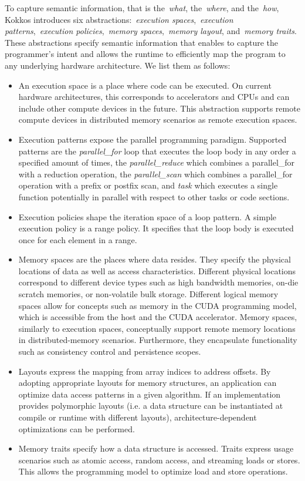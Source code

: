 To capture semantic information, that is the~\emph{what}, the~\emph{where}, and the~\emph{how}, Kokkos introduces six abstractions:~\emph{execution spaces},~\emph{execution patterns},~\emph{execution policies},~\emph{memory spaces},~\emph{memory layout}, and~\emph{memory traits}. These abstractions specify semantic information that enables to capture the programmer's intent and allows the runtime to efficiently map the program to any underlying hardware architecture. We list them as follows:
\begin{itemize}
	\item  An execution space is a place where code can be executed. On current hardware architectures, this corresponds to accelerators and CPUs and can include other compute devices in the future. This abstraction supports remote compute devices in distributed memory scenarios as remote execution spaces.
	\item Execution patterns expose the parallel programming paradigm. Supported patterns are the \emph{parallel\_for} loop that executes the loop body in any order a specified amount of times, the \emph{parallel\_reduce} which combines a parallel\_for with a reduction operation, the \emph{parallel\_scan} which combines a parallel\_for operation with a prefix or postfix scan, and \emph{task} which executes a single function potentially in parallel with respect to other tasks or code sections. 
	\item Execution policies shape the iteration space of a loop pattern. A simple execution policy is a range policy. It specifies that the loop body is executed once for each element in a range.
	\item Memory spaces are the places where data resides. They specify the physical locations of data as well as access characteristics. Different physical locations correspond to different device types such as high bandwidth memories, on-die scratch memories, or non-volatile bulk storage. Different logical memory spaces allow for concepts such as memory in the CUDA programming model, which is accessible from the host and the CUDA accelerator. Memory spaces, similarly to execution spaces, conceptually support remote memory locations in distributed-memory scenarios. Furthermore, they encapsulate functionality such as consistency control and persistence scopes.
	\item Layouts express the mapping from array indices to address offsets. By adopting appropriate layouts for memory structures, an application can optimize data access patterns in a given algorithm. If an implementation provides polymorphic layouts (i.e. a data structure can be instantiated at compile or runtime with different layouts), architecture-dependent optimizations can be performed.
	\item Memory traits specify how a data structure is accessed. Traits express usage scenarios such as atomic access, random access, and streaming loads or stores. This allows the programming model to optimize load and store operations.
\end{itemize}

